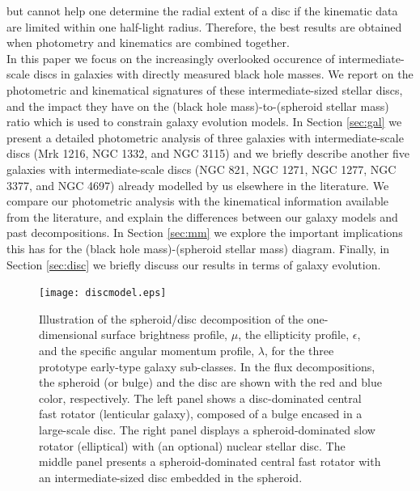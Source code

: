 \documentclass[useAMS,usenatbib,article]{mnras}
\begin{document}
but cannot help one determine the radial extent of a disc if the kinematic data are limited within one half-light radius. 
Therefore, the best results are obtained when photometry and kinematics are combined together. \\
In this paper we focus on the increasingly overlooked occurence of intermediate-scale discs in galaxies with directly measured black hole masses. 
We report on the photometric and kinematical signatures of these intermediate-sized stellar discs,  
and the impact they have on the (black hole mass)-to-(spheroid stellar mass) ratio 
which is used to constrain galaxy evolution models. 
In Section \ref{sec:gal} we present a detailed photometric analysis of three galaxies with intermediate-scale discs (Mrk 1216, NGC 1332, and NGC 3115) 
and we briefly describe another five galaxies with intermediate-scale discs (NGC 821, NGC 1271, NGC 1277, NGC 3377, and NGC 4697) 
already modelled by us elsewhere in the literature. 
We compare our photometric analysis with the kinematical information available from the literature, 
and explain the differences between our galaxy models and past decompositions. 
In Section \ref{sec:mm} we explore the important implications this has for the (black hole mass)-(spheroid stellar mass) diagram. 
Finally, in Section \ref{sec:disc} we briefly discuss our results in terms of galaxy evolution. 




\begin{figure}
\begin{center}
\texttt{[image: discmodel.eps]}
\caption{Illustration of the spheroid/disc decomposition of the one-dimensional surface brightness profile, $\mu$, 
the ellipticity profile, $\epsilon$, and the specific angular momentum profile, $\lambda$,
for the three prototype early-type galaxy sub-classes. 
In the flux decompositions, the spheroid (or bulge) and the disc are shown with the red and blue color, respectively. 
The left panel shows a disc-dominated central fast rotator (lenticular galaxy), composed of a bulge encased in a large-scale disc. 
The right panel displays a spheroid-dominated slow rotator (elliptical) with (an optional) nuclear stellar disc. 
The middle panel presents a spheroid-dominated central fast rotator with an intermediate-sized disc embedded in the spheroid. }
\label{fig:model}
\end{center}
\end{figure}
\end{document}
